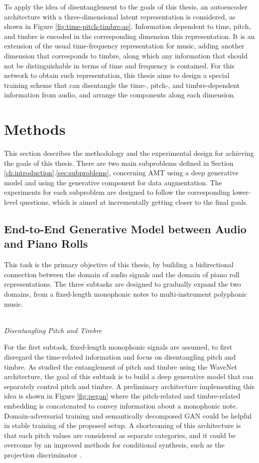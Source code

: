 To apply the idea of disentanglement to the goals of this thesis, an autoencoder architecture with a three-dimensional latent representation is considered, as shown in Figure \ref{fig:time-pitch-timbre-ae}.
Information dependent to time, pitch, and timbre is encoded in the corresponding dimension this representation.
It is an extension of the usual time-frequency representation for music, adding another dimension that corresponds to timbre, along which any information that should not be distinguishable in terms of time and frequency is contained.
For this network to obtain such representation, this thesis aims to design a special training scheme that can disentangle the time-, pitch-, and timbre-dependent information from audio, and arrange the components along each dimension.


\section{Methods}

This section describes the methodology and the experimental design for achieving the goals of this thesis.
There are two main subproblems defined in Section \ref{ch:introduction}.\ref{sec:subproblems}, concerning AMT using a deep generative model and using the generative component for data augmentation.
The experiments for each subproblem are designed to follow the corresponding lower-level questions, which is aimed at incrementally getting closer to the final goals.

\subsection{End-to-End Generative Model between Audio and Piano Rolls}

This task is the primary objective of this thesis, by building a bidirectional connection between the domain of audio signals and the domain of piano roll representations.
The three subtasks are designed to gradually expand the two domains, from a fixed-length monophonic notes to multi-instrument polyphonic music.

\mbox{}\\\noindent\emph{Disentangling Pitch and Timbre}\mbox{}

For the first subtask, fixed-length monophonic signals are assumed, to first disregard the time-related information and focus on disentangling pitch and timbre.
As  studied the entanglement of pitch and timbre using the WaveNet architecture, the goal of this subtask is to build a deep generative model that can separately control pitch and timbre.
A preliminary architecture implementing this idea is shown in Figure \ref{fig:pegan} where the pitch-related and timbre-related embedding is concatenated to convey information about a monophonic note.
Domain-adversarial training \cite{ganin2015domain} and semantically decomposed GAN \cite{donahue2017gan} could be helpful in stable training of the proposed setup.
A shortcoming of this architecture is that each pitch values are considered as separate categories, and it could be overcome by an improved methods for conditional synthesis, such as the projection discriminator \cite{miyato2018cgan}.

